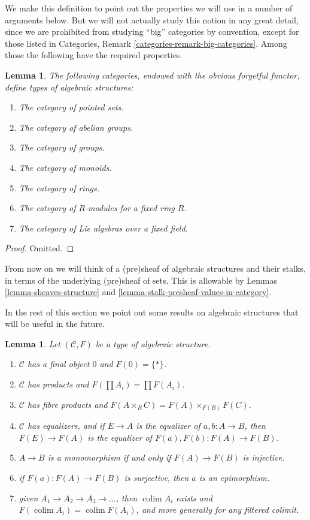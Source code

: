 \documentclass{stacks-project}
\theoremstyle{plain}
\newtheorem{lemma}[subsection]{Lemma}
\theoremstyle{definition}
\theoremstyle{remark}
\numberwithin{equation}{subsection}
\def\colim{\mathop{\mathrm{colim}}\nolimits}
\begin{document}
\noindent
We make this definition to point out the properties
we will use in a number of arguments below.  But we will
not actually study this notion in any great detail, since we
are prohibited from studying ``big'' categories by convention,
except for those listed in
Categories, Remark \ref{categories-remark-big-categories}.
Among those the following have the required properties.

\begin{lemma}
\label{lemma-list-algebraic-structures}
The following categories, endowed with the obvious forgetful
functor, define types of algebraic structures:
\begin{enumerate}
\item The category of pointed sets.
\item The category of abelian groups.
\item The category of groups.
\item The category of monoids.
\item The category of rings.
\item The category of $R$-modules for a fixed ring $R$.
\item The category of Lie algebras over a fixed field.
\end{enumerate}
\end{lemma}

\begin{proof}
Omitted.
\end{proof}

\noindent
From now on we will think of a (pre)sheaf of algebraic structures
and their stalks, in terms of the underlying (pre)sheaf of sets.
This is allowable by Lemmas \ref{lemma-sheaves-structure} and
\ref{lemma-stalk-presheaf-values-in-category}.

\medskip\noindent
In the rest of this section we point out some results
on algebraic structures that will be useful in the future.

\begin{lemma}
\label{lemma-properties-algebraic-structures}
Let $(\mathcal{C}, F)$ be a type of algebraic structure.
\begin{enumerate}
\item $\mathcal{C}$ has a final object $0$ and $F(0) = \{ * \}$.
\item $\mathcal{C}$ has products and $F(\prod A_i) = \prod F(A_i)$.
\item $\mathcal{C}$ has fibre products and
$F(A \times_B C) = F(A)\times_{F(B)}F(C)$.
\item $\mathcal{C}$ has equalizers, and if $E \to A$
is the equalizer of $a, b : A \to B$, then
$F(E) \to F(A)$ is the equalizer of $F(a), F(b) : F(A) \to F(B)$.
\item $A \to B$ is a monomorphism if and only if
$F(A) \to F(B)$ is injective.
\item if $F(a) : F(A) \to F(B)$ is surjective, then
$a$ is an epimorphism.
\item given $A_1 \to A_2 \to A_3 \to \ldots$, then
$\colim A_i$ exists and $F(\colim A_i) = \colim F(A_i)$,
and more generally for any filtered colimit.
\end{enumerate}
\end{lemma}
\end{document}
